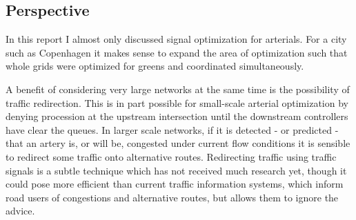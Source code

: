 \subsection{Perspective}
In this report I almost only discussed signal optimization for arterials. For a city such as Copenhagen it makes sense to expand the area of optimization such that whole grids were optimized for greens and coordinated simultaneously.

A benefit of considering very large networks at the same time is the possibility of traffic redirection. This is in part possible for small-scale arterial optimization by denying procession at the upstream intersection until the downstream controllers have clear the queues. In larger scale networks, if it is detected - or predicted - that an artery is, or will be, congested under current flow conditions it is sensible to redirect some traffic onto alternative routes. 
Redirecting traffic using traffic signals is a subtle technique which has not received much research yet, though it could pose more efficient than current traffic information systems, which inform road users of congestions and alternative routes, but allows them to ignore the advice.
